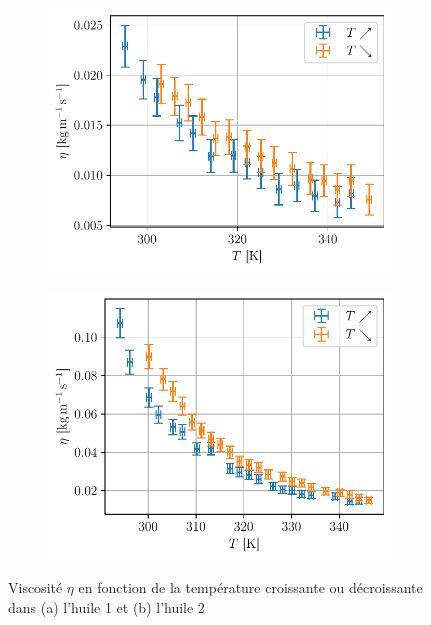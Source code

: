 \begin{figure}[h]
    \centering
    \begin{subfigure}{0.48\linewidth}
        \centering
        \includegraphics[width=\linewidth]{figures/huile1_eta.pdf}
        \caption{}
        \label{fig:huile1_eta}
    \end{subfigure}
    \begin{subfigure}{0.48\linewidth}
        \centering
        \includegraphics[width=\linewidth]{figures/huile2_eta.pdf}
        \caption{}
        \label{fig:huile2_eta}
    \end{subfigure}
    \caption{Viscosité \(\eta\) en fonction de la température croissante ou décroissante dans (a) l'huile 1 et (b) l'huile 2}
\end{figure}

